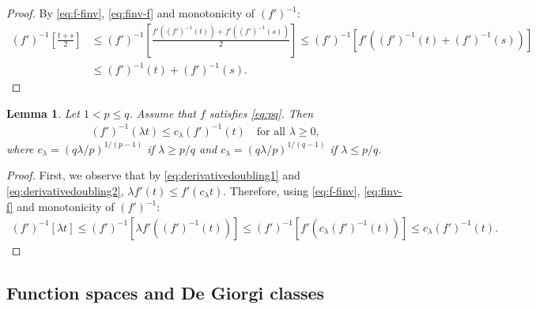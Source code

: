 \documentclass[11pt]{amsart}
\theoremstyle{plain}
\newtheorem{lemma}[theorem]{Lemma}
\theoremstyle{definition}
\numberwithin{equation}{section}
\begin{document}
\begin{proof}
By \eqref{eq:f-finv}, \eqref{eq:finv-f} and monotonicity of $(f')^{-1} $:
\begin{align*}
(f')^{-1} \left[ \frac{t+s}{2} \right] &\le (f')^{-1} \left[ \frac{f'((f')^{-1}(t))+ f'((f')^{-1}(s))}{2} \right] \le (f')^{-1} \left[ f'\left((f')^{-1}(t)+(f')^{-1}(s)\right) \right]\\
&\le (f')^{-1}(t)+(f')^{-1}(s).
\end{align*}
\end{proof}

\begin{lemma}
\label{lem:fprimeinvdoubling}
Let $1 < p \le q$. Assume that $f$ satisfies \eqref{eq:pq}. Then
\begin{align*}
(f')^{-1}(\lambda t) \le c_\lambda (f')^{-1}(t) \quad \text{for all } \lambda \geq 0,
\end{align*}
where $c_{\lambda} = (q\lambda/p)^{1/(p-1)}$ if $\lambda \geq p/q$ and $c_{\lambda} = (q\lambda/p)^{1/(q-1)}$ if $\lambda \leq p/q$.
\end{lemma}

\begin{proof}
First, we observe that by \eqref{eq:derivativedoubling1} and \eqref{eq:derivativedoubling2}, $\lambda f'(t) \le f'(c_{\lambda} t)$. Therefore, using \eqref{eq:f-finv}, \eqref{eq:finv-f} and monotonicity of $(f')^{-1} $:
\begin{align*}
(f')^{-1}\left[\lambda t\right] \le (f')^{-1}\left[\lambda f'((f')^{-1}(t))\right] \le (f')^{-1}\left[ f'(c_{\lambda}(f')^{-1}(t))\right] \le c_{\lambda}(f')^{-1}(t).
\end{align*}
\end{proof}


\subsection{Function spaces and De Giorgi classes}\label{subsec:functionspacesdegiorgi}
\end{document}
